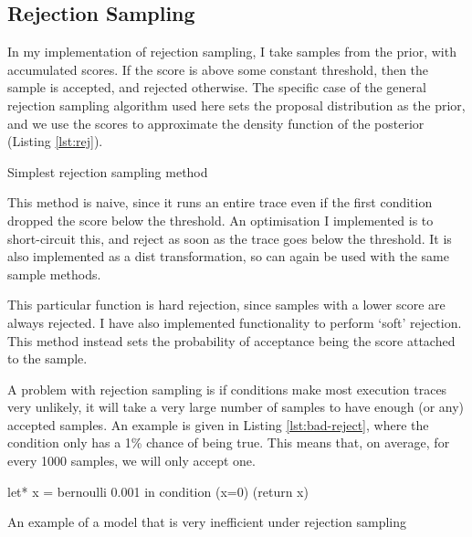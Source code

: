 \subsection{Rejection Sampling} \label{sec:rej}
In my implementation of rejection sampling, I take samples from the prior, with accumulated scores. If the score is above some constant threshold, then the sample is accepted, and rejected otherwise. The specific case of the general rejection sampling algorithm used here sets the proposal distribution as the prior, and we use the scores to approximate the density function of the posterior (Listing \ref{lst:rej}).
				
\begin{listing}[!htb]
	\centering
	\caption{Simplest rejection sampling method}
	\label{lst:rej}
\end{listing}
				
This method is naive, since it runs an entire trace even if the first condition dropped the score below the threshold. An optimisation I implemented is to short-circuit this, and reject as soon as the trace goes below the threshold. It is also implemented as a dist transformation, so can again be used with the same sample methods.
				
This particular function is hard rejection, since samples with a lower score are always rejected. I have also implemented functionality to perform `soft' rejection. This method instead sets the probability of acceptance being the score attached to the sample.
				
A problem with rejection sampling is if conditions make most execution traces very unlikely, it will take a very large number of samples to have enough (or any) accepted samples. An example is given in Listing \ref{lst:bad-reject}, where the condition only has a 1\% chance of being true. This means that, on average, for every 1000 samples, we will only accept one.
				
\begin{listing}[!htb]
	\centering
	\begin{ocamlcode-in}
		let* x = bernoulli 0.001 in
		condition (x=0)
		(return x)
	\end{ocamlcode-in}
			
	\caption{An example of a model that is very inefficient under rejection sampling}
	\label{lst:bad-reject}
\end{listing}
% 
